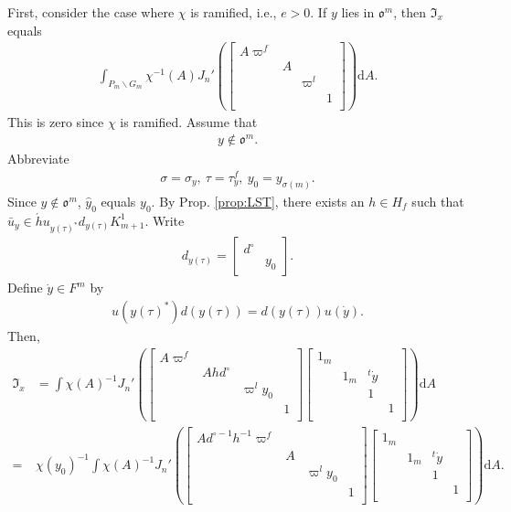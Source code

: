 \documentclass[11pt]{amsart}
\newcommand\s{\sigma}%
\newcommand\Vp{\varpi}%
\newcommand\vp{\varphi}%
\newcommand\oo{\mathfrak{o}}
\newcommand\If{\mathfrak{I}}
\newcommand\dr{\mathrm{d}}
\newcommand\1{\mathbf{1}}
\newcommand\ac{\acute}
\newcommand\bs{\backslash}%
\newcommand\bu{\bar{u}}
\numberwithin{equation}{section}
\begin{document}
First, consider the case where $\chi$ is ramified, i.e., $e > 0$.
If $y$ lies in $\oo^{m}$, then $\If_x$ equals
\begin{align*}
\int_{P_m \bs G_{m}} \chi^{-1}(A) J_n'(\begin{bmatrix}
A \Vp^f  & & &  \\
&A & & \\
& & \Vp^l &  \\
& & &1  \\
\end{bmatrix}) \dr A.
\end{align*} 
This is zero since $\chi$ is ramified.
Assume that 
\begin{align*}
y \not\in \oo^m.
\end{align*}
Abbreviate 
\begin{align*}
\s = \s_y, \ \tau = \tau_y^f, \ y_0 = y_{\s(m)}.
\end{align*}
Since $y \not\in \oo^m$, $\hat{y}_{0}$ equals $y_{0}$.
By Prop. \ref{prop:LST}, there exists an $h \in H_f$ such that $\bu_y \in \ac{h} u_{y(\tau)^*}d_{y(\tau)} K^1_{m+1}$.
Write 
\begin{align*}
d_{y(\tau)} = \begin{bmatrix}
d^\circ &  \\
& y_{0}
\end{bmatrix}.
\end{align*} 
Define $\dot{y} \in F^{m}$ by 
\begin{align*}
u(y(\tau)^*)d(y(\tau)) = d(y(\tau)) u(\dot{y}).
\end{align*}  
Then, 
\begin{align*}
\If_x &= \int \chi(A)^{-1} J_n'(\begin{bmatrix}
A \Vp^f & & &  \\
&A h d^\circ & & \\
& &\Vp^l y_{0}&  \\
& & &1  \\
\end{bmatrix}
\begin{bmatrix}
1_m & & &  \\
& 1_m & {}^t \dot{y} & \\
& & 1&  \\
& & &1  \\
\end{bmatrix}) \dr A \\
=& \chi(y_0)^{-1}\int \chi(A)^{-1} J_n'(\begin{bmatrix}
A d_{}^{\circ -1} h^{-1} \Vp^f & & &  \\
&A & & \\
& & \Vp^l y_{0} &  \\
& & &1  \\
\end{bmatrix}
\begin{bmatrix}
1_m & & &  \\
& 1_m & {}^t \dot{y}& \\
& & 1&  \\
& & &1  \\
\end{bmatrix}) \dr A.
\end{align*} 
\end{document}
